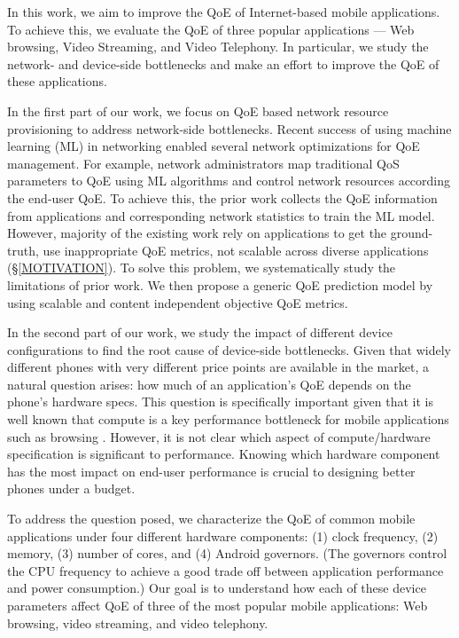 In this work, we aim to improve the QoE of Internet-based mobile applications.
To achieve this, we evaluate the QoE of three popular applications --- Web browsing, Video Streaming, and Video Telephony. 
In particular, we study the network- and device-side bottlenecks and make an effort to improve the QoE of these applications.

In the first part of our work, we focus on QoE based network resource provisioning to address network-side bottlenecks.
Recent success of using machine learning (ML) in networking enabled several network optimizations for QoE management.
For example, network administrators map traditional QoS parameters to QoE using ML algorithms and control network resources according the end-user QoE. 
To achieve this, the prior work collects the QoE information from applications and corresponding network statistics to train the ML model. 
However, majority of the existing work rely on applications to get the ground-truth, use inappropriate QoE metrics, not scalable across diverse applications (\S\ref{MOTIVATION}).
To solve this problem, we systematically study the limitations of prior work. We then propose a generic QoE prediction model by using scalable and content independent objective QoE metrics.

In the second part of our work, we study the impact of different device configurations to find the root cause of device-side bottlenecks.
Given that widely different phones with very different price points are available in the market, a natural question arises: how much of an application's QoE depends on the phone's hardware specs.
This question is specifically important given that it is well known that compute is a key performance bottleneck for mobile applications such as browsing \cite{nejati2016depth}. However, it is not clear which aspect of compute/hardware specification is significant to performance. Knowing which hardware component has the most impact on end-user performance is crucial to designing better phones under a budget.

To address the question posed, we characterize the QoE of common mobile applications under four different hardware components: (1) clock frequency, (2) memory, (3) number of cores, and (4) Android governors. (The governors control the CPU frequency to achieve a good trade off between application performance and power consumption.) Our goal is to understand how each of these device parameters affect QoE of three of the most popular mobile applications: Web browsing, video streaming, and video telephony.

